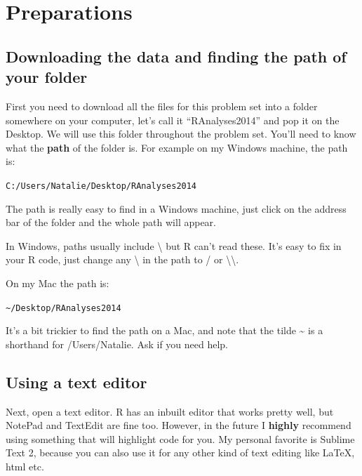 \documentclass[12pt]{article}
\begin{document}
\newpage{}
\section{Preparations}

\subsection{Downloading the data and finding the path of your folder}

First you need to download all the files for this problem set into a
folder somewhere on your computer, let's call it ``RAnalyses2014'' and
pop it on the Desktop. We will use this folder throughout the problem
set. You'll need to know what the \textbf{path} of the folder is. For
example on my Windows machine, the path is:

\begin{snugshade}
\texttt{C:/Users/Natalie/Desktop/RAnalyses2014}
\end{snugshade}

The path is really easy to find in a Windows machine, just click on the
address bar of the folder and the whole path will appear.

\begin{framed}
In Windows, paths usually include \textbackslash{} but R
can't read these. It's easy to fix in your R code, just change any \textbackslash{} in
the path to / or \textbackslash{}\textbackslash{}.
\end{framed}

On my Mac the path is:

\begin{snugshade}
\texttt{\textasciitilde{}/Desktop/RAnalyses2014}
\end{snugshade}

It's a bit trickier to find the path on a Mac, and note that the tilde
\textasciitilde{} is a shorthand for /Users/Natalie. Ask if you need help.

\subsection{Using a text editor}

Next, open a text editor. R has an inbuilt editor that works pretty
well, but NotePad and TextEdit are fine too. However, in the future I
\textbf{highly} recommend using something that will highlight code for
you. My personal favorite is Sublime Text 2, because you can also use
it for any other kind of text editing like LaTeX, html etc.
\end{document}
